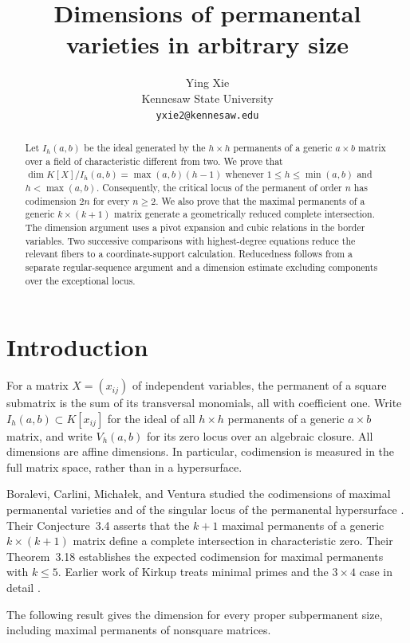 \documentclass[11pt]{article}
\title{Dimensions of permanental varieties in arbitrary size}
\author{Ying Xie\\[3pt]
  \small Kennesaw State University\\
  \small\texttt{yxie2@kennesaw.edu}}
\date{}
\theoremstyle{remark}
\newcommand{\kk}{K}
\numberwithin{equation}{section}
\begin{document}
\maketitle
\begin{abstract}
Let $I_h(a,b)$ be the ideal generated by the $h\times h$ permanents
of a generic $a\times b$ matrix over a field of characteristic different
from two. We prove that
$\dim \kk[X]/I_h(a,b)=\max(a,b)(h-1)$ whenever
$1\leq h\leq\min(a,b)$ and $h<\max(a,b)$.
Consequently, the critical locus of the permanent of order $n$ has
codimension $2n$ for every $n\geq2$. We also prove that the maximal
permanents of a generic $k\times(k+1)$ matrix generate a geometrically
reduced complete intersection. The dimension argument uses a pivot
expansion and cubic relations in the border variables. Two successive
comparisons with highest-degree equations reduce the relevant fibers
to a coordinate-support calculation. Reducedness follows from a
separate regular-sequence argument and a dimension estimate excluding
components over the exceptional locus.
\end{abstract}

\section{Introduction}

For a matrix $X=(x_{ij})$ of independent variables, the permanent of a
square submatrix is the sum of its transversal monomials, all with
coefficient one. Write $I_h(a,b)\subset\kk[x_{ij}]$ for the ideal of
all $h\times h$ permanents of a generic $a\times b$ matrix, and write
$V_h(a,b)$ for its zero locus over an algebraic closure. All dimensions
are affine dimensions. In particular, codimension is measured in the
full matrix space, rather than in a hypersurface.

Boralevi, Carlini, Micha\l ek, and Ventura studied the codimensions of
maximal permanental varieties and of the singular locus of the
permanental hypersurface \cite{BCMV}. Their Conjecture~3.4 asserts that
the $k+1$ maximal permanents of a generic $k\times(k+1)$ matrix define
a complete intersection in characteristic zero. Their Theorem~3.18
establishes the expected codimension for maximal permanents with
$k\leq5$. Earlier work of Kirkup treats minimal primes and the
$3\times4$ case in detail \cite[Section~7]{Kirkup}.

The following result gives the dimension for every proper subpermanent
size, including maximal permanents of nonsquare matrices.
\end{document}
